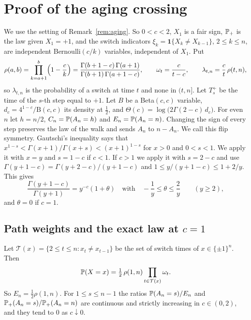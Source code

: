 \section{Proof of the aging crossing}\label{app:aging}

We use the setting of Remark~\ref{rem:aging}. So $0<c<2$, $X_1$ is a fair sign, $\mathbb{P}_+$ is
the law given $X_1=+1$, and the switch indicators $\xi_k=\mathbf 1\{X_k\ne X_{k-1}\}$,
$2\le k\le n$, are independent Bernoulli$(c/k)$ variables, independent of $X_1$. Put
\[
\rho(a,b)=\prod_{k=a+1}^{b}\Bigl(1-\frac ck\Bigr)
=\frac{\Gamma(b+1-c)\,\Gamma(a+1)}{\Gamma(b+1)\,\Gamma(a+1-c)},\qquad
\omega_t=\frac{c}{t-c},\qquad
\lambda_{t,n}=\frac ct\,\rho(t,n),
\]
so $\lambda_{t,n}$ is the probability of a switch at time $t$ and none in $(t,n]$. Let $T^+_s$
be the time of the $s$-th step equal to $+1$. Let $B$ be a Beta$(c,c)$ variable,
$d_c=4^{1-c}/\mathrm B(c,c)$ its density at $\frac12$, and
$\Theta(c)=\log\bigl(2\Gamma(2-c)\,d_c\bigr)$. For even $n$ let $h=n/2$, $C_n=\mathbb{P}(A_n=h)$ and
$E_n=\mathbb{P}(A_n=n)$. Changing the sign of every step preserves the law of the walk and sends
$A_n$ to $n-A_n$. We call this flip symmetry. Gautschi's inequality \cite{gautschi1959} says
that $x^{1-s}<\Gamma(x+1)/\Gamma(x+s)<(x+1)^{1-s}$ for $x>0$ and $0<s<1$. We apply it with
$x=y$ and $s=1-c$ if $c<1$. If $c>1$ we apply it with $s=2-c$ and use
$\Gamma(y+1-c)=\Gamma(y+2-c)/(y+1-c)$ and $1\le y/(y+1-c)\le1+2/y$. This gives
\begin{equation}\label{eq:D-gamma}
\frac{\Gamma(y+1-c)}{\Gamma(y+1)}=y^{-c}(1+\theta)\quad\text{with}\quad
-\frac1y\le\theta\le\frac2y\qquad(y\ge2),
\end{equation}
and $\theta=0$ if $c=1$.

\subsection{Path weights and the exact law at \texorpdfstring{$c=1$}{c=1}}

\begin{proposition}\label{prop:D-paths}
Let $\mathcal T(x)=\{2\le t\le n:x_t\ne x_{t-1}\}$ be the set of switch times of
$x\in\{\pm1\}^n$. Then
\begin{equation}\label{eq:D-path}
\mathbb{P}(X=x)=\tfrac12\,\rho(1,n)\prod_{t\in\mathcal T(x)}\omega_t .
\end{equation}
So $E_n=\frac12\rho(1,n)$. For $1\le s\le n-1$ the ratios $\mathbb{P}(A_n=s)/E_n$ and
$\mathbb{P}_+(A_n=s)/\mathbb{P}_+(A_n=n)$ are continuous and strictly increasing in $c\in(0,2)$, and they
tend to $0$ as $c\downarrow0$.
\end{proposition}

